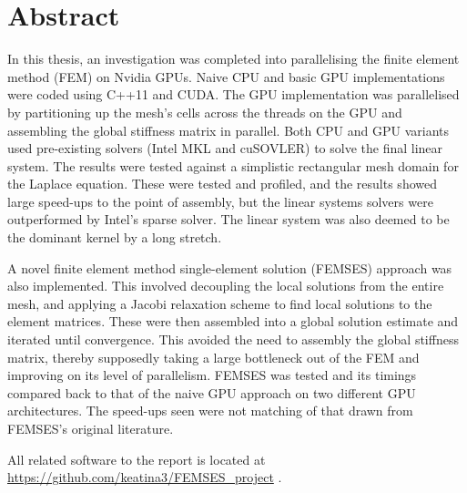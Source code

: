 \clearpage
\thispagestyle{empty}
\section*{Abstract}

\vspace{1.0cm}

\begin{small}
In this thesis, an investigation was completed into parallelising the finite element method (FEM) on Nvidia GPUs. Naive CPU and basic GPU implementations were coded using C++11 and CUDA. The GPU implementation was parallelised by partitioning up the mesh's cells across the threads on the GPU and assembling the global stiffness matrix in parallel. Both CPU and GPU variants used pre-existing solvers (Intel MKL and cuSOVLER) to solve the final linear system. The results were tested against a simplistic rectangular mesh domain for the Laplace equation. These were tested and profiled, and the results showed large speed-ups to the point of assembly, but the linear systems solvers were outperformed by Intel's sparse solver. The linear system was also deemed to be the dominant kernel by a long stretch.

A novel finite element method single-element solution (FEMSES) approach was also implemented. This involved decoupling the local solutions from the entire mesh, and applying a Jacobi relaxation scheme to find local solutions to the element matrices. These were then assembled into a global solution estimate and iterated until convergence. This avoided the need to assembly the global stiffness matrix, thereby supposedly taking a large bottleneck out of the FEM and improving on its level of parallelism. FEMSES was tested and its timings compared back to that of the naive GPU approach on two different GPU architectures. The speed-ups seen were not matching of that drawn from FEMSES's original literature.

All related software to the report is located at \url{https://github.com/keatina3/FEMSES_project} .

\end{small}